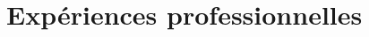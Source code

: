 \documentclass[letterpaper]{twentysecondcv} %
\begin{document}
\vspace{-0.55cm} %

\section{Expériences professionnelles}
\vspace{-0.25cm}
\end{document}

